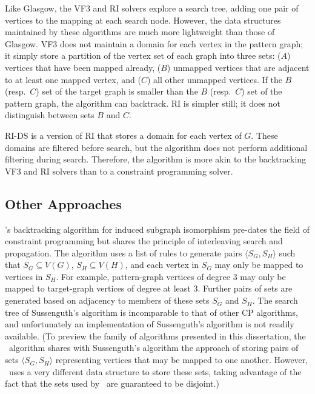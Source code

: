 Like Glasgow, the VF3 \citep{DBLP:journals/pami/CarlettiFSV18} and RI
\citep{DBLP:journals/bmcbi/BonniciGPSF13,DBLP:journals/tcbb/BonniciG17}
solvers explore a search tree, adding one pair of vertices to the mapping at each
search node.  However, the data structures maintained by these algorithms are
much more lightweight than those of Glasgow.  VF3 does not maintain
a domain for each vertex in the pattern graph; it simply store a partition
of the vertex set of each graph into three sets: ($A$) vertices that have been
mapped already, ($B$) unmapped vertices that are adjacent to at least one mapped vertex, and
($C$) all other unmapped vertices.
If the $B$ (resp.\ $C$) set of the target graph is smaller than the $B$ (resp.\ $C$)
set of the pattern graph, the algorithm can backtrack.
RI is simpler still; it does not distinguish between sets $B$ and $C$.

RI-DS \citep{DBLP:journals/bmcbi/BonniciGPSF13} is a version of RI that
stores a domain for each vertex of $G$. These domains are filtered before search,
but the algorithm does not perform additional filtering during search.  Therefore,
the algorithm is more akin to the backtracking VF3 and RI solvers than to a
constraint programming solver.

\subsection{Other Approaches}\label{subsec:other-approaches-sip}

\citet{sussenguth1965graph}'s backtracking algorithm for induced subgraph
isomorphism pre-dates the field of constraint programming but shares the
principle of interleaving search and propagation.  The algorithm uses
a list of rules to generate
pairs $\langle S_G, S_H \rangle$ such that $S_G \subseteq V(G)$, $S_H \subseteq
V(H)$, and each vertex in $S_G$ may only be mapped to vertices in $S_H$.
For example, pattern-graph vertices of degree 3 may only be mapped to
target-graph vertices of degree at least 3.
Further pairs of sets are generated based on adjacency to
members of these sets $S_G$ and $S_H$.
The search tree of Sussenguth's algorithm is incomparable to that of
other CP algorithms, and unfortunately an implementation of Sussenguth's
algorithm is not readily available.
(To preview the family of algorithms
presented in this dissertation, the \McSplit\ algorithm shares with
Sussenguth's algorithm the approach of storing pairs of sets $\langle S_G, S_H
\rangle$ representing vertices that may be mapped to one another. However,
\McSplit\ uses a very different data structure to store these sets, taking
advantage of the fact that the sets used by \McSplit\ are guaranteed to be
disjoint.)

